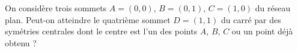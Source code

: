 On considère trois sommets $A = (0, 0)$, $B = (0, 1)$, $C = (1, 0)$ du réseau plan. Peut-on atteindre le quatrième sommet $D = (1, 1)$ du carré par des symétries centrales dont le centre est l'un des points $A$, $B$, $C$ ou un point déjà obtenu ?
